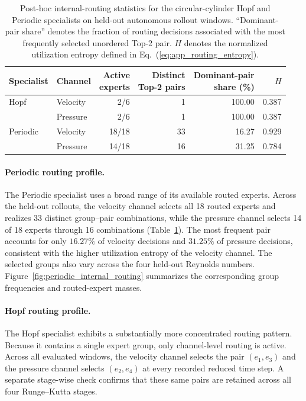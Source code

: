 \documentclass{article}
\def\plaineqref#1{\ref{#1}}
\begin{document}
\par
\begin{table}[H]
\centering
\caption{
Post-hoc internal-routing statistics for the circular-cylinder Hopf and Periodic specialists on held-out autonomous rollout windows. ``Dominant-pair share'' denotes the fraction of routing decisions associated with the most frequently selected unordered Top-2 pair. $H$ denotes the normalized utilization entropy defined in Eq.~(\plaineqref{eq:app_routing_entropy}).
}
\label{tab:internal_routing_summary}
\small
\setlength{\tabcolsep}{5pt}
\begin{tabular}{@{}llrrrr@{}}
\toprule
Specialist & Channel & \shortstack{Active\\experts} & \shortstack{Distinct\\Top-2 pairs} & \shortstack{Dominant-pair\\share (\%)} & $H$ \\
\midrule
Hopf & Velocity & 2/6 & 1 & 100.00 & 0.387 \\
     & Pressure & 2/6 & 1 & 100.00 & 0.387 \\
\addlinespace
Periodic & Velocity & 18/18 & 33 & 16.27 & 0.929 \\
         & Pressure & 14/18 & 16 & 31.25 & 0.784 \\
\bottomrule
\end{tabular}
\end{table}
\par

\paragraph{Periodic routing profile.}
The Periodic specialist uses a broad range of its available routed experts. Across the held-out rollouts, the velocity channel selects all 18 routed experts and realizes 33 distinct group--pair combinations, while the pressure channel selects 14 of 18 experts through 16 combinations (Table~\ref{tab:internal_routing_summary}). The most frequent pair accounts for only $16.27\%$ of velocity decisions and $31.25\%$ of pressure decisions, consistent with the higher utilization entropy of the velocity channel. The selected groups also vary across the four held-out Reynolds numbers.
Figure~\ref{fig:periodic_internal_routing} summarizes the corresponding group frequencies and routed-expert masses.



\paragraph{Hopf routing profile.}
The Hopf specialist exhibits a substantially more concentrated routing pattern. Because it contains a single expert group, only channel-level routing is active. Across all evaluated windows, the velocity channel selects the pair
$(e_1,e_3)$ and the pressure channel selects $(e_2,e_4)$ at every recorded reduced time step. A separate stage-wise check confirms that these same pairs are retained across all four Runge--Kutta stages.
\end{document}
